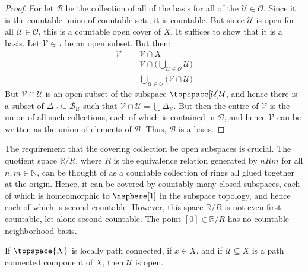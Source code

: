 \documentclass{article}                                                        %
\begin{document}
        \begin{proof}
            For let $\mathcal{B}$ be the collection of all of the basis for all
            of the $\mathcal{U}\in\mathcal{O}$. Since it is the countable union
            of countable sets, it is countable. But since $\mathcal{U}$ is open
            for all $\mathcal{U}\in\mathcal{O}$, this is a countable open cover
            of $X$. It suffices to show that it is a basis. Let
            $\mathcal{V}\in\tau$ be an open subset. But then:
            \begin{align}
                \mathcal{V}&=\mathcal{V}\cap{X}\\
                &=\mathcal{V}\cap\Big(
                    \bigcup_{\mathcal{U}\in\mathcal{O}}\mathcal{U}
                \Big)\\
                &=\bigcup_{\mathcal{U}\in\mathcal{O}}
                    \big(\mathcal{V}\cap\mathcal{U}\big)
            \end{align}
            But $\mathcal{V}\cap\mathcal{U}$ is an open subset of the subspace
            $\topspace[\mathcal{U}]{\mathcal{U}}$, and hence there is a subset
            of $\Delta_{\mathcal{V}}\subseteq\mathcal{B}_{\mathcal{U}}$ such
            that $\mathcal{V}\cap\mathcal{U}=\bigcup\Delta_{\mathcal{V}}$. But
            then the entire of $\mathcal{V}$ is the union of all such
            collections, each of which is contained in $\mathcal{B}$, and hence
            $\mathcal{V}$ can be written as the union of elements of
            $\mathcal{B}$. Thus, $\mathcal{B}$ is a basis.
        \end{proof}
        The requirement that the covering collection be open subspaces is
        crucial. The quotient space $\mathbb{R}/R$, where $R$ is the equivalence
        relation generated by $nRm$ for all $n,m\in\mathbb{N}$, can be thought
        of as a countable collection of rings all glued together at the origin.
        Hence, it can be covered by countably many closed subspaces, each of
        which is homeomorphic to $\nsphere[1]$ in the subspace topology, and
        hence each of which is second countable. However, this space
        $\mathbb{R}/R$ is not even first countable, let alone second countable.
        The point $[0]\in\mathbb{R}/R$ has no countable neighborhood basis.
        \begin{theorem}
            \label{thm:loc_path_con_imply_path_comps_open}%
            If $\topspace{X}$ is locally path connected, if $x\in{X}$, and if
            $\mathcal{U}\subseteq{X}$ is a path connected component of $X$,
            then $\mathcal{U}$ is open.
        \end{theorem}
\end{document}
